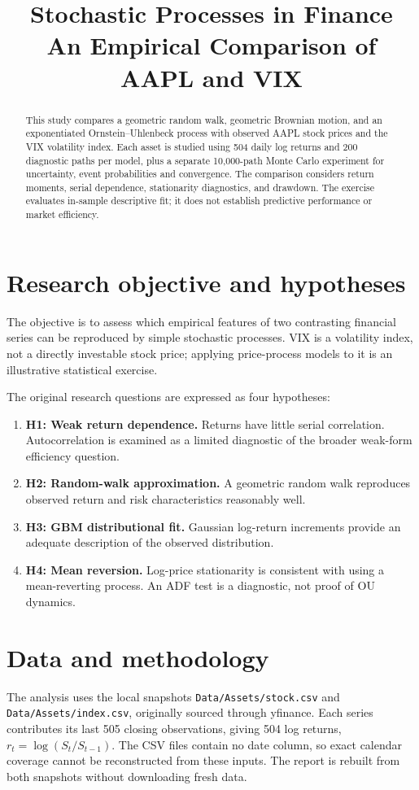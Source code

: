 \documentclass[11pt,a4paper]{article}
\title{\color{ink}Stochastic Processes in Finance\\\large An Empirical Comparison of AAPL and VIX}
\author{}\date{}
\begin{document}
\maketitle
\begin{abstract}
This study compares a geometric random walk, geometric Brownian motion,
and an exponentiated Ornstein--Uhlenbeck process with observed AAPL stock
prices and the VIX volatility index. Each asset is studied using 504 daily
log returns and 200 diagnostic paths per model, plus a separate 10,000-path
Monte Carlo experiment for uncertainty, event probabilities and convergence.
The comparison considers
return moments, serial dependence, stationarity diagnostics, and drawdown.
The exercise evaluates in-sample descriptive fit; it does not establish
predictive performance or market efficiency.
\end{abstract}

\section{Research objective and hypotheses}
The objective is to assess which empirical features of two contrasting
financial series can be reproduced by simple stochastic processes.
VIX is a volatility index, not a directly investable stock price; applying
price-process models to it is an illustrative statistical exercise.

The original research questions are expressed as four hypotheses:
\begin{enumerate}
\item \textbf{H1: Weak return dependence.} Returns have little serial
correlation. Autocorrelation is examined as a limited diagnostic of the
broader weak-form efficiency question.
\item \textbf{H2: Random-walk approximation.} A geometric random walk
reproduces observed return and risk characteristics reasonably well.
\item \textbf{H3: GBM distributional fit.} Gaussian log-return increments
provide an adequate description of the observed distribution.
\item \textbf{H4: Mean reversion.} Log-price stationarity is consistent
with using a mean-reverting process. An ADF test is a diagnostic, not proof
of OU dynamics.
\end{enumerate}

\clearpage
\section{Data and methodology}
The analysis uses the local snapshots \texttt{Data/Assets/stock.csv} and
\texttt{Data/Assets/index.csv}, originally sourced through yfinance.
Each series contributes its last 505 closing observations, giving 504
log returns, $r_t=\log(S_t/S_{t-1})$. The CSV files contain no date column,
so exact calendar coverage cannot be reconstructed from these inputs.
The report is rebuilt from both snapshots without downloading fresh data.
\end{document}
